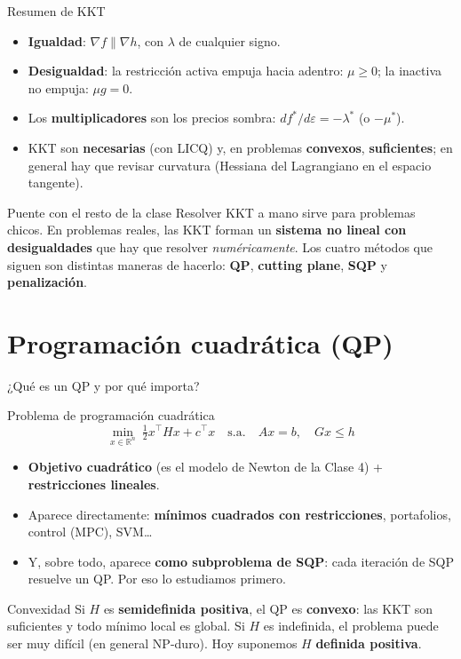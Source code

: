 \documentclass[aspectratio=169]{beamer}
\newcommand{\grad}{\nabla}
\newcommand{\R}{\mathbb{R}}
\begin{document}
\begin{frame}{Resumen de KKT}
  \begin{itemize}
    \item \textbf{Igualdad}: $\grad f\parallel\grad h$, con $\lambda$ de cualquier signo.
    \item \textbf{Desigualdad}: la restricción activa empuja hacia adentro: $\mu\ge0$; la inactiva no empuja: $\mu g=0$.
    \item Los \textbf{multiplicadores} son los precios sombra: $df^\ast/d\varepsilon=-\lambda^\ast$ (o $-\mu^\ast$).
    \item KKT son \textbf{necesarias} (con LICQ) y, en problemas \textbf{convexos}, \textbf{suficientes}; en general hay que revisar curvatura (Hessiana del Lagrangiano en el espacio tangente).
  \end{itemize}
  \begin{alertblock}{Puente con el resto de la clase}
    Resolver KKT a mano sirve para problemas chicos. En problemas reales, las KKT forman un \textbf{sistema no lineal con desigualdades} que hay que resolver \emph{numéricamente}. Los cuatro métodos que siguen son distintas maneras de hacerlo: \textbf{QP}, \textbf{cutting plane}, \textbf{SQP} y \textbf{penalización}.
  \end{alertblock}
\end{frame}
\section{Programación cuadrática (QP)}

\begin{frame}{¿Qué es un QP y por qué importa?}
  \begin{block}{Problema de programación cuadrática}
    \[ \min_{x\in\R^n}\ \tfrac12 x^\top Hx+c^\top x\quad\text{s.a.}\quad Ax=b,\quad Gx\le h \]
  \end{block}
  \begin{itemize}
    \item \textbf{Objetivo cuadrático} (es el modelo de Newton de la Clase 4) + \textbf{restricciones lineales}.
    \item Aparece directamente: \textbf{mínimos cuadrados con restricciones}, portafolios, control (MPC), SVM\dots
    \item Y, sobre todo, aparece \textbf{como subproblema de SQP}: cada iteración de SQP resuelve un QP. Por eso lo estudiamos primero.
  \end{itemize}
  \begin{alertblock}{Convexidad}
    Si $H$ es \textbf{semidefinida positiva}, el QP es \textbf{convexo}: las KKT son suficientes y todo mínimo local es global. Si $H$ es indefinida, el problema puede ser muy difícil (en general NP-duro). Hoy suponemos $H$ \textbf{definida positiva}.
  \end{alertblock}
\end{frame}
\end{document}
